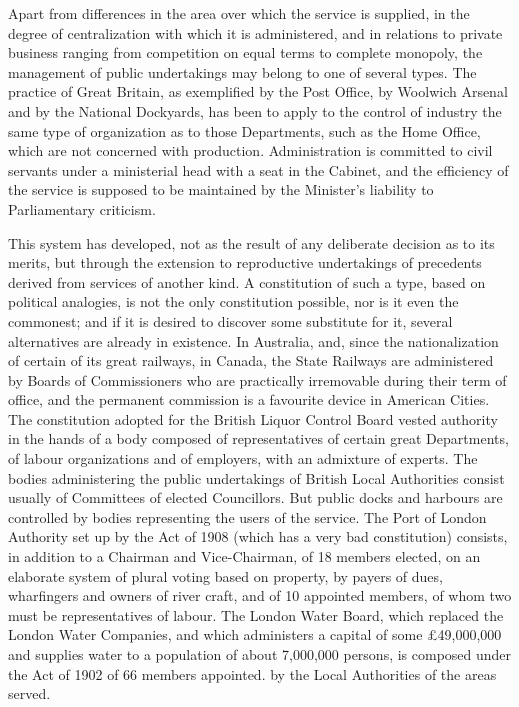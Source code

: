 \documentclass{book}
\begin{document}
Apart from differences in the area over which the service is supplied, in the degree of centralization with which it is administered, and in relations to private business ranging from competition on equal terms to complete monopoly, the management of public undertakings may belong to one of several types. The practice of Great Britain, as exemplified by the Post Office, by Woolwich Arsenal and by the National Dockyards, has been to apply to the control of industry the same type of organization as to those Departments, such as the Home Office, which are not concerned with production. Administration is committed to civil servants under a ministerial head with a seat in the Cabinet, and the efficiency of the service is supposed to be maintained by the Minister’s liability to Parliamentary criticism.

This system has developed, not as the result of any deliberate decision as to its merits, but through the extension to reproductive undertakings of precedents derived from services of another kind. A constitution of such a type, based on political analogies, is not the only constitution possible, nor is it even the commonest; and if it is desired to discover some substitute for it, several alternatives are already in existence. In Australia, and, since the nationalization of certain of its great railways, in Canada, the State Railways are administered by Boards of Commissioners who are practically irremovable during their term of office, and the permanent commission is a favourite device in American Cities. The constitution adopted for the British Liquor Control Board vested authority in the hands of a body composed of representatives of certain great Departments, of labour organizations and of employers, with an admixture of experts. The bodies administering the public undertakings of British Local Authorities consist usually of Committees of elected Councillors. But public docks and harbours are controlled by bodies representing the users of the service. The Port of London Authority set up by the Act of 1908 (which has a very bad constitution) consists, in addition to a Chairman and Vice-Chairman, of 18 members elected, on an elaborate system of plural voting based on property, by payers of dues, wharfingers and owners of river craft, and of 10 appointed members, of whom two must be representatives of labour. The London Water Board, which replaced the London Water Companies, and which administers a capital of some £49,000,000 and supplies water to a population of about 7,000,000 persons, is composed under the Act of 1902 of 66 members appointed. by the Local Authorities of the areas served.
\end{document}
